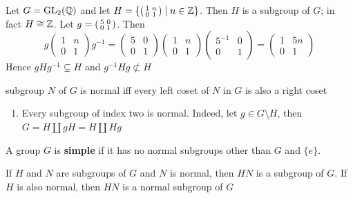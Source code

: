 \documentclass[11pt]{article}
\begin{document}
\begin{examplle}[]
\label{1.33}
Let \(G=\operatorname{GL}_2(\mathbb{Q})\) and let \(H=\{\begin{psmallmatrix}1&n\\0&1\end{psmallmatrix}\mid n\in\mathbb{Z}\}\).
Then \(H\) is a subgroup of \(G\); in fact \(H\cong\mathbb{Z}\).
Let \(g=\begin{psmallmatrix}5&0\\0&1\end{psmallmatrix}\). Then
\begin{equation*}
g
\begin{pmatrix}
1&n\\0&1
\end{pmatrix}g^{-1}=
\begin{pmatrix}
5&0\\0&1
\end{pmatrix}\begin{pmatrix}
1&n\\0&1
\end{pmatrix}
\begin{pmatrix}
5^{-1}&0\\0&1
\end{pmatrix}=
\begin{pmatrix}
1&5n\\0&1
\end{pmatrix}
\end{equation*}
Hence \(gHg^{-1}\subsetneq H\) and \(g^{-1}Hg\not\subset H\)
\end{examplle}

\begin{proposition}[]
subgroup \(N\) of \(G\) is normal iff every left coset of \(N\) in \(G\) is also a right coset
\end{proposition}

\begin{examplle}[]
\begin{enumerate}
\item Every subgroup of index two is normal. Indeed, let \(g\in G\setminus H\), then \(G=H\coprod gH=H\coprod Hg\)
\end{enumerate}
\end{examplle}

A group \(G\) is \textbf{simple} if it has no normal subgroups other than \(G\) and \(\{e\}\).

\begin{proposition}[]
If \(H\) and \(N\) are subgroups of \(G\) and \(N\) is normal, then \(HN\) is a subgroup
of \(G\). If \(H\) is also normal, then \(HN\) is a normal subgroup of \(G\)
\end{proposition}
\end{document}
